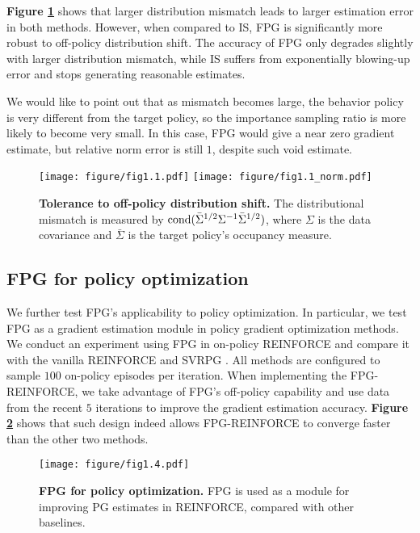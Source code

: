 \documentclass{article}
\numberwithin{equation}{section}
\begin{document}
\textbf{Figure \ref{fig:FrozenLake_2}} shows that larger distribution mismatch leads to larger estimation error in both methods. However, when compared to IS, FPG is significantly more robust to off-policy distribution shift. The accuracy of FPG only degrades slightly with larger distribution mismatch, while IS suffers from exponentially blowing-up error and stops generating reasonable estimates. 

We would like to point out that as mismatch becomes large, the behavior policy is very different from the target policy, so the importance sampling ratio is more likely to become very small. In this case, FPG would give a near zero gradient estimate, but relative norm error is still $1$, despite such void estimate.


\begin{figure}[!t]
 \centering
  \texttt{[image: figure/fig1.1.pdf]}
  \texttt{[image: figure/fig1.1\_norm.pdf]}
\caption{\textbf{Tolerance to off-policy distribution shift.} The distributional mismatch is measured by  $\hbox{cond}(\bar{\Sigma}^{1/2}\Sigma^{-1}\bar{\Sigma}^{1/2})$, where $\Sigma$ is the data covariance and $\bar{\Sigma}$ is the target policy's occupancy measure.}
\label{fig:FrozenLake_2}
\end{figure}

\subsection{FPG for policy optimization}
\label{sec:exp-optimization}

We further test FPG's applicability to policy optimization. In particular, we test FPG as a gradient estimation module in policy gradient optimization methods. We conduct an experiment using FPG in on-policy REINFORCE and compare it with the vanilla REINFORCE and SVRPG \cite{papini2018stochastic}. All methods are configured to sample $100$ on-policy episodes per iteration. When implementing the FPG-REINFORCE, we take advantage of FPG's off-policy capability and use data from the recent $5$ iterations to improve the gradient estimation accuracy. \textbf{Figure \ref{fig:FrozenLake_3}} shows that such design indeed allows FPG-REINFORCE to converge faster than the other two methods.

\begin{figure}[!t]
 \centering
 \texttt{[image: figure/fig1.4.pdf]}
\caption{\textbf{FPG for policy optimization.} FPG is used as a module for improving PG estimates in REINFORCE, compared with other baselines.}
\label{fig:FrozenLake_3}
\end{figure}
\end{document}
